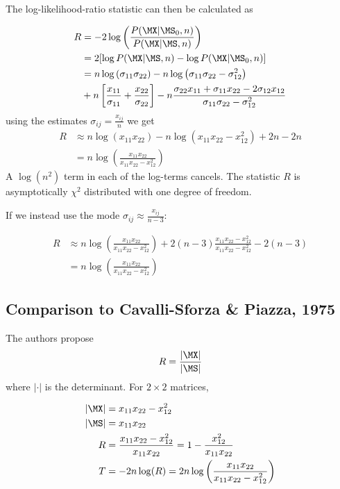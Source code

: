 \documentclass[12pt, letterpaper]{article}
\begin{document}
The log-likelihood-ratio statistic can then be calculated as 

\begin{align}
    R &= - 2 \log  \left( \frac{P(\MX | \MS_0, n)}{ P(\MX | \MS, n)} \right)  \nonumber\\
    &=2 [\log P(\MX | \MS, n) - \log P(\MX | \MS_0, n) ] \nonumber\\
    &=  n \log \left( \sigma_{11}\sigma_{22}\right) - n \log \left( \sigma_{11}\sigma_{22} - \sigma_{12}^2\right)  \nonumber\\
    &+  n\left[\frac{x_{11}}{\sigma_{11}}  + \frac{x_{22}}{\sigma_{22}}\right] 
    - n\frac{\sigma_{22}x_{11} + \sigma_{11}x_{22} -2 \sigma_{12}x_{12}} {\sigma_{11}\sigma_{22} -  \sigma_{12}^2} 
\end{align}
using the estimates $\sigma_{ij} = \frac{x_{ij}}{n}$ we get
\begin{align}
    R&\approx n \log \left( x_{11}x_{22}\right) - n \log \left( x_{11}x_{22} - x_{12}^2\right) + 2n - 2n  \nonumber\\
     &= n  \log \left( \frac{x_{11}x_{22}}{x_{11}x_{22} - x_{12}^2}  \right)
\end{align}
 A $\log(n^2)$ term in each of the log-terms cancels. The statistic $R$ is asymptotically $\chi^2$ distributed with one degree of freedom.

If we instead use the mode $\sigma_{ij} \approx \frac{x_{ij}}{n-3}$:

\begin{align}
    R&\approx n  \log \left( \frac{x_{11}x_{22}}{x_{11}x_{22} - x_{12}^2}  \right)
+2 (n-3) \frac{x_{11}x_{22} - x_{12}^2} {x_{11}x_{22} -  x_{12}^2} 
    - 2(n-3) \nonumber\\
     &= n  \log \left( \frac{x_{11}x_{22}}{x_{11}x_{22} - x_{12}^2}  \right)
\end{align}

\subsection{Comparison to Cavalli-Sforza \& Piazza, 1975}
The authors propose 
\begin{equation}
    R = \frac{|\MX|}{|\MS|}
\end{equation}
where $|\cdot|$ is the determinant. For $2 \times 2$ matrices,


\begin{align}
|\MX| &= x_{11}x_{22} - x_{12}^2 \\
|\MS| &= x_{11}x_{22} \\
    R &= \frac{ x_{11}x_{22} - x_{12}^2}{ x_{11}x_{22}} =1 - \frac{ x_{12}^2}{ x_{11}x_{22}}\\
    T &= -2 n \log (R) = 2 n \log \left( \frac{ x_{11}x_{22}}{ x_{11}x_{22} - x_{12}^2}\right)
\end{align}
\end{document}
